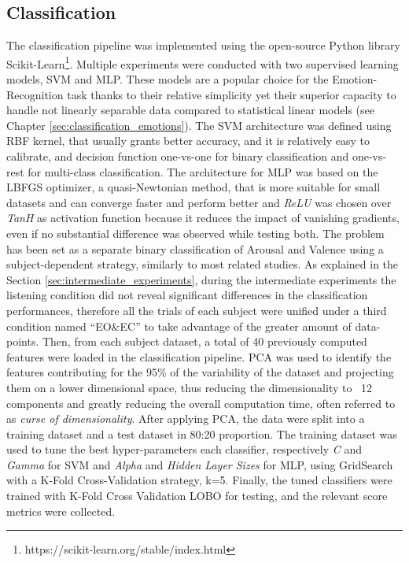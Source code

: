 \subsection{Classification}
\label{sec:classification}
The classification pipeline was implemented using the open-source Python library Scikit-Learn\footnote{https://scikit-learn.org/stable/index.html}. Multiple experiments were conducted with two supervised learning models, \ac{SVM} and \ac{MLP}. These models are a popular choice for the Emotion-Recognition task thanks to their relative simplicity yet their superior capacity to handle not linearly separable data compared to statistical linear models (see Chapter \ref{sec:classification_emotions}). The \ac{SVM} architecture was defined using RBF kernel, that usually grants better accuracy, and it is relatively easy to calibrate, and decision function one-vs-one for binary classification and one-vs-rest for multi-class classification. The architecture for \ac{MLP} was based on the LBFGS optimizer, a quasi-Newtonian method, that is more suitable for small datasets and can converge faster and perform better and \emph{ReLU} was chosen over \emph{TanH} as activation function because it reduces the impact of vanishing gradients, even if no substantial difference was observed while testing both. The problem has been set as a separate binary classification of Arousal and Valence using a subject-dependent strategy, similarly to most related studies. As explained in the Section \ref{sec:intermediate_experiments}, during the intermediate experiments the listening condition did not reveal significant differences in the classification performances, therefore all the trials of each subject were unified under a third condition named “EO\&EC” to take advantage of the greater amount of data-points. Then, from each subject dataset, a total of 40 previously computed features were loaded in the classification pipeline. \ac{PCA} was used to identify the features contributing for the 95\% of the variability of the dataset and projecting them on a lower dimensional space, thus reducing the dimensionality to ~12 components and greatly reducing the overall computation time, often referred to as \emph{curse of dimensionality}. After applying \ac{PCA}, the data were split into a training dataset and a test dataset in 80:20 proportion. The training dataset was used to tune the best hyper-parameters each classifier, respectively \emph{C} and \emph{Gamma} for \ac{SVM} and \emph{Alpha} and \emph{Hidden Layer Sizes} for \ac{MLP}, using GridSearch with a K-Fold Cross-Validation strategy, k=5. Finally, the tuned classifiers were trained with K-Fold Cross Validation \ac{LOBO} for testing, and the relevant score metrics were collected.

